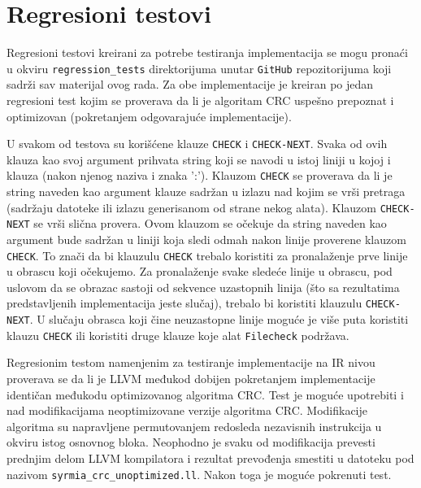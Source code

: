 \documentclass[12pt,oneside]{memoir}
\begin{document}
\section{Regresioni testovi}
Regresioni testovi kreirani za potrebe testiranja implementacija se mogu pronaći u okviru \texttt{regression\_tests} direktorijuma unutar \texttt{GitHub} repozitorijuma koji sadrži sav materijal ovog rada. Za obe implementacije je kreiran po jedan regresioni test kojim se proverava da li je algoritam CRC uspešno prepoznat i optimizovan (pokretanjem odgovarajuće implementacije). 

U svakom od testova su korišćene klauze \texttt{CHECK} i \texttt{CHECK-NEXT}. Svaka od ovih klauza kao svoj argument prihvata string koji se navodi u istoj liniji u kojoj i klauza (nakon njenog naziva i znaka ':'). Klauzom \texttt{CHECK} se proverava da li je string naveden kao argument klauze sadržan u izlazu nad kojim se vrši pretraga (sadržaju datoteke ili izlazu generisanom od strane nekog alata). Klauzom \texttt{CHECK-NEXT} se vrši slična provera. Ovom klauzom se očekuje da string naveden kao argument bude sadržan u liniji koja sledi odmah nakon linije proverene klauzom \texttt{CHECK}. To znači da bi klauzulu \texttt{CHECK} trebalo koristiti za pronalaženje prve linije u obrascu koji očekujemo. Za pronalaženje svake sledeće linije u obrascu, pod uslovom da se obrazac sastoji od sekvence uzastopnih linija (što sa rezultatima predstavljenih implementacija jeste slučaj), trebalo bi koristiti klauzulu \texttt{CHECK-NEXT}. U slučaju obrasca koji čine neuzastopne linije moguće je više puta koristiti klauzu \texttt{CHECK} ili koristiti druge klauze koje alat \texttt{Filecheck} podržava.

Regresionim testom namenjenim za testiranje implementacije na IR nivou proverava se da li je LLVM međukod dobijen pokretanjem implementacije identičan međukodu optimizovanog algoritma CRC. Test je moguće upotrebiti i nad modifikacijama neoptimizovane verzije algoritma CRC. Modifikacije algoritma su napravljene permutovanjem redosleda nezavisnih instrukcija u okviru istog osnovnog bloka. Neophodno je svaku od modifikacija prevesti prednjim delom LLVM kompilatora i rezultat prevođenja smestiti u datoteku pod nazivom \texttt{syrmia\_crc\_unoptimized.ll}. Nakon toga je moguće pokrenuti test.

\end{document}
